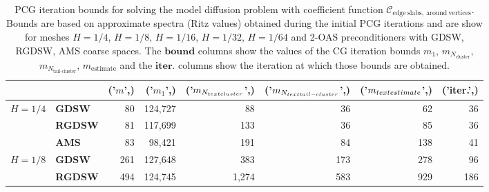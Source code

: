 \begin{table}[H]
\centering
\caption{PCG iteration bounds for solving the model diffusion problem with coefficient function $\mathcal{C}_{\mathrm{edge \ slabs, \ around \ vertices}}$. Bounds are based on approximate spectra (Ritz values) obtained during the initial PCG iterations and are show for meshes $H=1/4$, $H=1/8$, $H=1/16$, $H=1/32$, $H=1/64$ and 2-OAS preconditioners with GDSW, RGDSW, AMS coarse spaces. The $\textbf{bound}$ columns show the values of the CG iteration bounds $m_1$, $m_{N_{\text{cluster}}}$, $m_{N_{\text{tail-cluster}}}$, $m_{\text{estimate}}$ and the $\textbf{iter.}$ columns show the iteration at which those bounds are obtained.}
\label{tab:cg_iteration_bound_coef=slabs_around_vertices}
\begin{tabular}{llrrrrrr}
\toprule
 &  & ('$m$',) & ('$m_1$',) & ('$m_{N_{\\text{cluster}}}$',) & ('$m_{N_{\\text{tail-cluster}}}$',) & ('$m_{\\text{estimate}}$',) & ('iter.',) \\
\midrule
\multirow[c]{3}{*}{\bfseries $H=1/4$} & \bfseries GDSW & 80 & {\cellcolor[HTML]{E2E4FB}} \color[HTML]{000000} 124,727 & {\cellcolor[HTML]{405FE5}} \color[HTML]{F1F1F1} 88 & {\cellcolor[HTML]{ACB8F4}} \color[HTML]{000000} 36 & {\cellcolor[HTML]{768BEC}} \color[HTML]{F1F1F1} 62 & 36 \\
\cline{2-8}
\bfseries  & \bfseries RGDSW & 81 & {\cellcolor[HTML]{E2E4FB}} \color[HTML]{000000} 117,699 & {\cellcolor[HTML]{ACB8F4}} \color[HTML]{000000} 133 & {\cellcolor[HTML]{768BEC}} \color[HTML]{F1F1F1} 36 & {\cellcolor[HTML]{405FE5}} \color[HTML]{F1F1F1} 85 & 36 \\
\cline{2-8}
\bfseries  & \bfseries AMS & 83 & {\cellcolor[HTML]{E2E4FB}} \color[HTML]{000000} 98,421 & {\cellcolor[HTML]{ACB8F4}} \color[HTML]{000000} 191 & {\cellcolor[HTML]{405FE5}} \color[HTML]{F1F1F1} 84 & {\cellcolor[HTML]{768BEC}} \color[HTML]{F1F1F1} 138 & 41 \\
\cline{1-8} \cline{2-8}
\multirow[c]{3}{*}{\bfseries $H=1/8$} & \bfseries GDSW & 261 & {\cellcolor[HTML]{E2E4FB}} \color[HTML]{000000} 127,648 & {\cellcolor[HTML]{ACB8F4}} \color[HTML]{000000} 383 & {\cellcolor[HTML]{768BEC}} \color[HTML]{F1F1F1} 173 & {\cellcolor[HTML]{405FE5}} \color[HTML]{F1F1F1} 278 & 96 \\
\cline{2-8}
\bfseries  & \bfseries RGDSW & 494 & {\cellcolor[HTML]{E2E4FB}} \color[HTML]{000000} 124,745 & {\cellcolor[HTML]{ACB8F4}} \color[HTML]{000000} 1,274 & {\cellcolor[HTML]{405FE5}} \color[HTML]{F1F1F1} 583 & {\cellcolor[HTML]{768BEC}} \color[HTML]{F1F1F1} 929 & 186 \\

\end{tabular}
\end{table}
